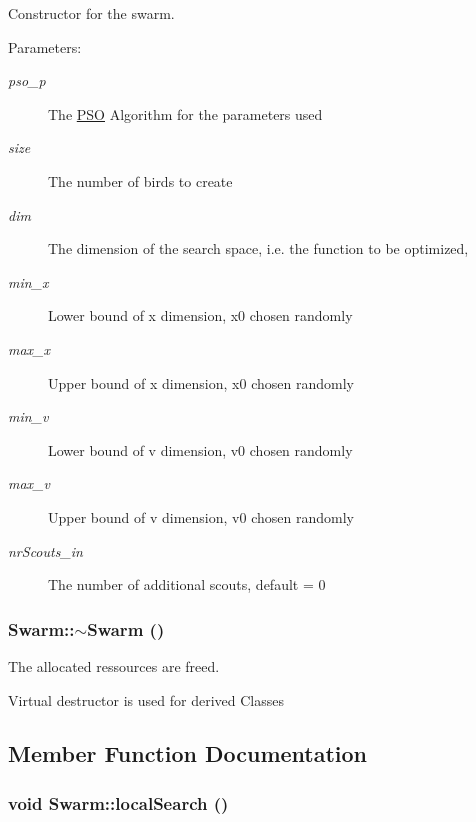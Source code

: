 Constructor for the swarm. 

\begin{Desc}
\item[Parameters: ]\par
\begin{description}
\item[{\em 
pso\_\-p}]The \hyperlink{classPSO}{PSO} Algorithm for the parameters used \item[{\em 
size}]The number of birds to create \item[{\em 
dim}]The dimension of the search space, i.e. the function to be optimized, \item[{\em 
min\_\-x}]Lower bound of x dimension, x0 chosen randomly \item[{\em 
max\_\-x}]Upper bound of x dimension, x0 chosen randomly \item[{\em 
min\_\-v}]Lower bound of v dimension, v0 chosen randomly \item[{\em 
max\_\-v}]Upper bound of v dimension, v0 chosen randomly \item[{\em 
nrScouts\_\-in}]The number of additional scouts, default = 0 \end{description}
\end{Desc}
\hypertarget{classSwarm_5d74bf7e768edf0d8930ba187005a583}{
\subsubsection{\setlength{\rightskip}{0pt plus 5cm}Swarm::$\sim$Swarm ()}}
\label{classSwarm_5d74bf7e768edf0d8930ba187005a583}


The allocated ressources are freed. 

Virtual destructor is used for derived Classes 

\subsection{Member Function Documentation}
\hypertarget{classSwarm_a76268fe09067ed70b04d8bd9d487a22}{
\subsubsection{\setlength{\rightskip}{0pt plus 5cm}void Swarm::localSearch ()}}
\label{classSwarm_a76268fe09067ed70b04d8bd9d487a22}


